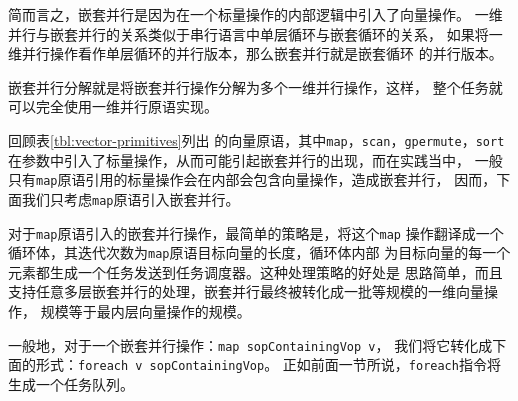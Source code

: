 简而言之，嵌套并行是因为在一个标量操作的内部逻辑中引入了向量操作。
一维并行与嵌套并行的关系类似于串行语言中单层循环与嵌套循环的关系，
如果将一维并行操作看作单层循环的并行版本，那么嵌套并行就是嵌套循环
的并行版本。
\begin{quotation}
\end{quotation}

嵌套并行分解就是将嵌套并行操作分解为多个一维并行操作，这样，
整个任务就可以完全使用一维并行原语实现。

回顾表\ref{tbl:vector-primitives}列出
的向量原语，其中\texttt{map}，\texttt{scan}，\texttt{gpermute}，\texttt{sort}
在参数中引入了标量操作，从而可能引起嵌套并行的出现，而在实践当中，
一般只有\texttt{map}原语引用的标量操作会在内部会包含向量操作，造成嵌套并行，
因而，下面我们只考虑\texttt{map}原语引入嵌套并行。

对于\texttt{map}原语引入的嵌套并行操作，最简单的策略是，将这个\texttt{map}
操作翻译成一个循环体，其迭代次数为\texttt{map}原语目标向量的长度，循环体内部
为目标向量的每一个元素都生成一个任务发送到任务调度器。这种处理策略的好处是
思路简单，而且支持任意多层嵌套并行的处理，嵌套并行最终被转化成一批等规模的一维向量操作，
规模等于最内层向量操作的规模。

一般地，对于一个嵌套并行操作：\texttt{map sopContainingVop v}，
我们将它转化成下面的形式：\texttt{foreach v sopContainingVop}。
正如前面一节所说，\texttt{foreach}指令将生成一个任务队列。


